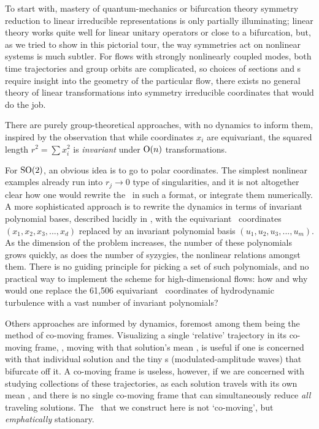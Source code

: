 \documentclass[aip,cha,reprint,
secnumarabic,
nofootinbib, tightenlines,
nobibnotes, showkeys, showpacs,
groupedaddress
]{revtex4-1}
\begin{document}
To start with, mastery of quantum-mechanics or bifurcation
theory symmetry reduction to linear irreducible
representations is only partially illuminating; linear theory
works quite well for linear unitary operators or close to a bifurcation,
but, as we tried to show in this pictorial tour, the way symmetries act
on nonlinear systems is much subtler. For flows with strongly nonlinearly
coupled modes, both time trajectories and  group orbits are complicated,
so choices of sections and \slice s require insight into the geometry of
the particular flow, there exists no general theory of linear
transformations into symmetry irreducible coordinates that would do the
job.

There are purely group-theoretical approaches, with no dynamics to inform
them, inspired by the observation that while coordinates $x_i$ are
equivariant, the squared length $r^2 = \sum x_i^2$ is \emph{invariant}
under $\textrm{O}(n)$ transformations.

For $\textrm{SO}(2)$, an obvious idea is to go to polar coordinates. The
simplest nonlinear examples already run into $r_j \to 0$ type
of singularities, and it is not altogether clear how one would rewrite
the \NSe\ in such a format, or integrate them numerically. A more
sophisticated  approach is to rewrite the dynamics in terms of
invariant polynomial bases, described lucidly in , with
the equivariant \statesp\ coordinates $(x_1,x_2,x_3,...,x_d)$ replaced by
an invariant polynomial basis $(u_1,u_2,u_3,...,u_m)$. As the dimension of
the problem increases, the number of these polynomials grows
quickly, as does the number of syzygies, the nonlinear relations amongst
them. There is no guiding principle for picking a set of such
polynomials, and no practical way to implement the
scheme for high-dimensional flows: how and why would one
replace the 61,506 equivariant \statesp\ coordinates of hydrodynamic
turbulence with a vast number of invariant polynomials?

Others approaches are informed by dynamics, foremost among them being the
method of {co-moving frames}. Visualizing a single `relative' trajectory
in its co-moving frame, \ie, moving with that solution's mean
{\phaseVel}, is useful if one is concerned with that individual solution
and the tiny \rpo s (modulated-amplitude waves) that bifurcate off
it. A co-moving frame is useless, however, if
we are concerned with studying collections of these trajectories, as each
solution travels with its own mean {\phaseVel}, and there is no single
co-moving frame that can simultaneously reduce \emph{all} traveling
solutions. The \slice\ that we construct here is not `co-moving', but
\emph{emphatically} stationary.
\end{document}
